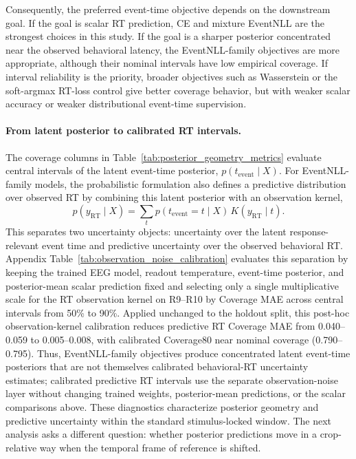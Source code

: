 \documentclass[12pt]{article}
\begin{document}
Consequently, the preferred event-time objective depends on the downstream goal. If the goal is scalar RT prediction, CE and mixture EventNLL are the strongest choices in this study. If the goal is a sharper posterior concentrated near the observed behavioral latency, the EventNLL-family objectives are more appropriate, although their nominal intervals have low empirical coverage. If interval reliability is the priority, broader objectives such as Wasserstein or the soft-argmax RT-loss control give better coverage behavior, but with weaker scalar accuracy or weaker distributional event-time supervision.

\paragraph{From latent posterior to calibrated RT intervals.}
The coverage columns in Table~\ref{tab:posterior_geometry_metrics} evaluate central intervals of the latent event-time posterior, \(p(t_{\mathrm{event}}\mid X)\). For EventNLL-family models, the probabilistic formulation also defines a predictive distribution over observed RT by combining this latent posterior with an observation kernel,
\[
p(y_{\mathrm{RT}}\mid X)=\sum_t p(t_{\mathrm{event}}=t\mid X)\,K(y_{\mathrm{RT}}\mid t).
\]
This separates two uncertainty objects: uncertainty over the latent response-relevant event time and predictive uncertainty over the observed behavioral RT. Appendix Table~\ref{tab:observation_noise_calibration} evaluates this separation by keeping the trained EEG model, readout temperature, event-time posterior, and posterior-mean scalar prediction fixed and selecting only a single multiplicative scale for the RT observation kernel on R9--R10 by Coverage MAE across central intervals from 50\% to 90\%. Applied unchanged to the holdout split, this post-hoc observation-kernel calibration reduces predictive RT Coverage MAE from 0.040--0.059 to 0.005--0.008, with calibrated Coverage80 near nominal coverage (0.790--0.795). Thus, EventNLL-family objectives produce concentrated latent event-time posteriors that are not themselves calibrated behavioral-RT uncertainty estimates; calibrated predictive RT intervals use the separate observation-noise layer without changing trained weights, posterior-mean predictions, or the scalar comparisons above. These diagnostics characterize posterior geometry and predictive uncertainty within the standard stimulus-locked window. The next analysis asks a different question: whether posterior predictions move in a crop-relative way when the temporal frame of reference is shifted.
\end{document}

